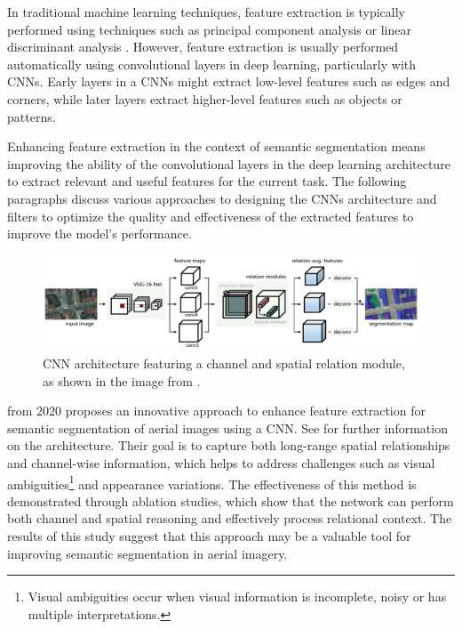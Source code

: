 In traditional machine learning techniques, feature extraction is typically performed using techniques such as principal component analysis \cite{abdi2010principal} or linear discriminant analysis \cite{balakrishnama1998linear}. However, feature extraction is usually performed automatically using convolutional layers in deep learning, particularly with \acp{CNN}. Early layers in a \acp{CNN} might extract low-level features such as edges and corners, while later layers extract higher-level features such as objects or patterns.\cite{hijazi2015using}

Enhancing feature extraction in the context of semantic segmentation means improving the ability of the convolutional layers in the deep learning architecture to extract relevant and useful features for the current task. The following paragraphs discuss various approaches to designing the \acp{CNN} architecture and filters to optimize the quality and effectiveness of the extracted features to improve the model's performance.

\begin{figure}[H]%
    \centering
    \includegraphics[width=\imgWidthXL]{images/relation_matters_network.png}
    \caption[Relation focused architecture]{\acf{CNN} architecture featuring a channel and spatial relation module, as shown in the image from \cite{9076866}.}
    \label{relation_matters_network}
\end{figure}

 \cite{9076866} from 2020 proposes an innovative approach to enhance feature extraction for semantic segmentation of aerial images using a \ac{CNN}. See  for further information on the architecture. Their goal is to capture both long-range spatial relationships and channel-wise information, which helps to address challenges such as visual ambiguities\footnote{Visual ambiguities occur when visual information is incomplete, noisy or has multiple interpretations.\cite{BibEntry2023MarAmbiguity}\cite{boring1930new}\cite{kanizsa1976subjective}} and appearance variations. The effectiveness of this method is demonstrated through ablation studies, which show that the network can perform both channel and spatial reasoning and effectively process relational context. The results of this study suggest that this approach may be a valuable tool for improving semantic segmentation in aerial imagery.

